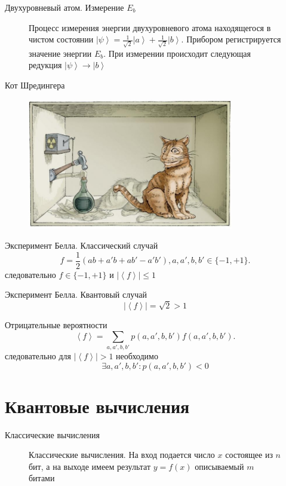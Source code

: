 \documentclass[10pt,pdf,hyperref={unicode}]{beamer}
\begin{document}
\begin{frame}{Двухуровневый атом. Измерение $E_b$}
\begin{figure}
\centering



\caption{Процесс измерения энергии двухуровневого атома находящегося в
чистом состоянии $\left|\psi\right> = 
\frac{1}{\sqrt{2}}\left|a\right> + \frac{1}{\sqrt{2}}\left|b\right>$.
Прибором регистрируется значение энергии $E_b$. При измерении
происходит следующая редукция $\left|\psi\right> \to \left|b\right>$
}
\label{fig:add:mesure_ex_b}
\end{figure}
\end{frame}

\begin{frame}{Кот Шредингера}
 \begin{figure} 
   \includegraphics[width=90mm,scale=0.5]{catshred.jpg}
  \end{figure}
\end{frame}

\begin{frame}{Эксперимент Белла. Классический случай}
\[
f = \frac{1}{2}\left(
a b + a' b + a b' - a' b'
\right), a,a',b,b' \in \{-1, +1\}.
\]
следовательно
\(
f \in \{-1, +1\}
\)
и
\(
\left|\left<f\right>\right| \le 1
\)
\end{frame}

\begin{frame}{Эксперимент Белла. Квантовый случай}
\[
\left|\left<f\right>\right| = \sqrt{2} > 1
\]
\end{frame}


\begin{frame}{Отрицательные вероятности}
\[
\left<f\right> = \sum_{a,a',b,b'} p(a,a',b,b') f(a,a',b,b').
\]
следовательно для $\left|\left<f\right>\right| > 1$ необходимо
\[
\exists a,a',b,b': p(a,a',b,b') < 0
\]
\end{frame}

\section{Квантовые вычисления}
\begin{frame}{Классические вычисления}
\begin{figure}
\centering



\caption{Классические вычисления. На вход подается число $x$ состоящее
  из $n$ бит, а на выходе имеем результат $y = f\left(x\right)$ описываемый $m$ битами}
\label{figQuantCompClassComp}
\end{figure}
\end{frame}
\end{document}

